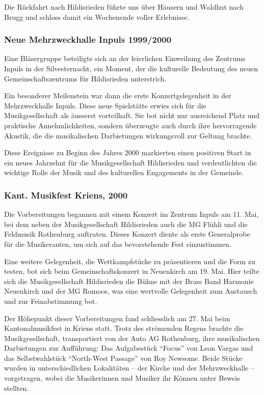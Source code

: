 \begin{history}
    Die Rückfahrt nach Hildisrieden führte uns über Häusern und Waldhut nach
    Brugg und schloss damit ein Wochenende voller Erlebnisse.

    \subsubsection{Neue Mehrzweckhalle Inpuls 1999/2000}

    Eine Bläsergruppe beteiligte sich an der feierlichen Einweihung des Zentrums
    Inpuls in der Silvesternacht, ein Moment, der die kulturelle Bedeutung des
    neuen Gemeinschaftszentrums für Hildisrieden unterstrich.

    Ein besonderer Meilenstein war dann die erste Konzertgelegenheit in der
    Mehrzweckhalle Inpuls. Diese neue Spielstätte erwies sich für die
    Musikgesellschaft als äusserst vorteilhaft. Sie bot nicht nur ausreichend
    Platz und praktische Annehmlichkeiten, sondern überzeugte auch durch ihre
    hervorragende Akustik, die die musikalischen Darbietungen wirkungsvoll zur
    Geltung brachte.

    Diese Ereignisse zu Beginn des Jahres 2000 markierten einen positiven Start
    in ein neues Jahrzehnt für die Musikgesellschaft Hildisrieden und
    verdeutlichten die wichtige Rolle der Musik und des kulturellen Engagements
    in der Gemeinde.

    \subsubsection*{Kant. Musikfest Kriens, 2000}

    Die Vorbereitungen begannen mit einem Konzert im Zentrum Inpuls am 11. Mai,
    bei dem neben der Musikgesellschaft Hildisrieden auch die MG Flühli und die
    Feldmusik Rothenburg auftraten. Dieses Konzert diente als erste Generalprobe
    für die Musikeranten, um sich auf das bevorstehende Fest einzustimmen.

    Eine weitere Gelegenheit, die Wettkampfstücke zu präsentieren und die Form
    zu testen, bot sich beim Gemeinschaftskonzert in Neuenkirch am 19. Mai. Hier
    teilte sich die Musikgesellschaft Hildisrieden die Bühne mit der Brass Band
    Harmonie Neuenkirch und der MG Romoos, was eine wertvolle Gelegenheit zum
    Austausch und zur Feinabstimmung bot.

    Der Höhepunkt dieser Vorbereitungen fand schliesslich am 27. Mai beim
    Kantonalmusikfest in Kriens statt. Trotz des strömenden Regens brachte die
    Musikgesellschaft, transportiert von der Auto AG Rothenburg, ihre
    musikalischen Darbietungen zur Aufführung: Das Aufgabestück \enquote{Focus}
    von Leon Vargas und das Selbstwahlstück \enquote{North-West Passage} von Roy
    Newsome. Beide Stücke wurden in unterschiedlichen Lokalitäten -- der Kirche
    und der Mehrzweckhalle -- vorgetragen, wobei die Musikerinnen und Musiker ihr
    Können unter Beweis stellten.


\end{history}
